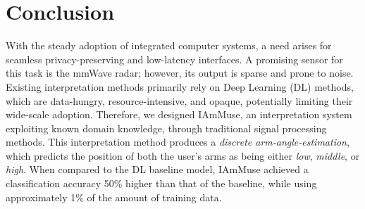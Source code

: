 \chapter{Conclusion}
\label{chapter: conclusion}

With the steady adoption of integrated computer systems, a need arises for seamless privacy-preserving and low-latency interfaces.
A promising sensor for this task is the mmWave radar; however, its output is sparse and prone to noise.
Existing interpretation methods primarily rely on Deep Learning (DL) methods, which are data-hungry, resource-intensive, and opaque, potentially limiting their wide-scale adoption.
Therefore, we designed IAmMuse, an interpretation system exploiting known domain knowledge, through traditional signal processing methods.
This interpretation method produces a \textit{discrete arm-angle-estimation}, which predicts the position of both the user's arms as being either \textit{low}, \textit{middle}, or \textit{high}.
When compared to the DL baseline model, IAmMuse achieved a classification accuracy 50\% higher than that of the baseline, while using approximately 1\% of the amount of training data.





